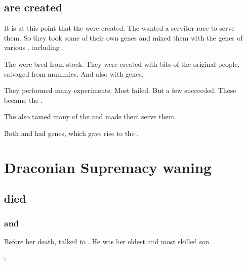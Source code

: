 \subsection{\Scathae{} are created}
It is at this point that the \scathae{} were created. 
The \dragons{} wanted a servitor race to serve them. 
So they took some of their own \ophidian{} genes and mixed them with the genes of various \saurians{}, including . 

The \scathae{} were bred from  stock. 
They were created with bits of the original \ophidian{} people, salvaged from mummies. 
And also with \cregorr{} genes. 

They performed many experiments. 
Most failed. 
But a few succeeded. 
These became the \scathae{}. 

The \dragons{} also tamed many of the \cregorrs{} and made them serve them. 

Both \scathae{} and \cregorrs{} had \xsic{} genes, which gave rise to the . 















\section{Draconian Supremacy waning}
\subsection{\Firstgendragons{} died}





\subsubsection{\Kserasshana{} and \Nexagglachel}
Before her death, \Kserasshana{} talked to \Nexagglachel. 
He was her eldest and most skilled son. 

\begin{prose}
  \Kserasshana: 
\end{prose}






